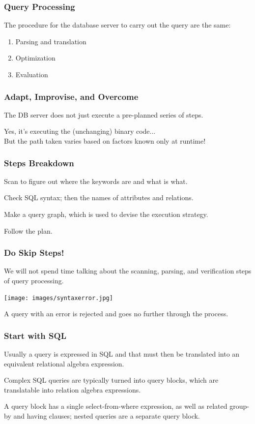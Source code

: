 \begin{frame}
\frametitle{Query Processing}

The procedure for the database server to carry out the query are the same:

\begin{enumerate}
	\item Parsing and translation
	\item Optimization
	\item Evaluation
\end{enumerate}

\end{frame}

\begin{frame}
\frametitle{Adapt, Improvise, and Overcome}

The DB server does not just execute a pre-planned series of steps.

Yes, it's executing the (unchanging) binary code...\\
\quad But the path taken varies based on factors known only at runtime!

\end{frame}

\begin{frame}
\frametitle{Steps Breakdown}
Scan to figure out where the keywords are and what is what.

Check SQL syntax; then the names of attributes and relations.

Make a query graph, which is used to devise the execution strategy. 

Follow the plan.

\end{frame}



\begin{frame}
\frametitle{Do Skip Steps!}

We will not spend time talking about the scanning, parsing, and verification steps of query processing.

\begin{center}
\texttt{[image: images/syntaxerror.jpg]}
\end{center}

A query with an error is rejected and goes no further through the process. 

\end{frame}

\begin{frame}
\frametitle{Start with SQL}
Usually a query is expressed in SQL and that must then be translated into an equivalent \alert{relational algebra} expression. 

Complex SQL queries are typically turned into \alert{query blocks}, which are translatable into relation algebra expressions. 

A query block has a single select-from-where expression, as well as related group-by and having clauses; nested queries are a separate query block.

\end{frame}

